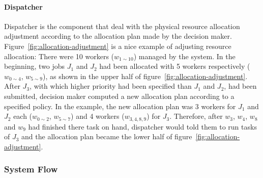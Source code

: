 \paragraph{Dispatcher}

Dispatcher is the component that deal with the physical resource
allocation adjustment according to the allocation plan made by the
decision maker.
Figure~\ref{fig:allocation-adjustment} is a nice example of adjusting
resource allocation: There were 10 workers ($w_{1\sim10}$) managed by
the system.
In the beginning, two jobs $J_1$ and $J_2$ had been allocated with 5
workers respectively ($w_{0\sim4}$, $w_{5\sim9}$), as shown in the upper
half of figure~\ref{fig:allocation-adjustment}.
After $J_3$, with which higher priority had been specified than $J_1$
and $J_2$, had been submitted, decision maker computed a new allocation
plan according to a specified policy.
In the example, the new allocation plan was 3 workers for $J_1$ and
$J_2$ each ($w_{0\sim2}$, $w_{5\sim7}$) and 4 workers ($w_{3,4,8,9}$)
for $J_3$.
Therefore, after $w_3$, $w_4$, $w_8$ and $ w_9$ had finished there task
on hand, dispatcher would told them to run tasks of $J_3$ and the
allocation plan became the lower half of
figure~\ref{fig:allocation-adjustment}.

%  

\subsubsection{System Flow}

